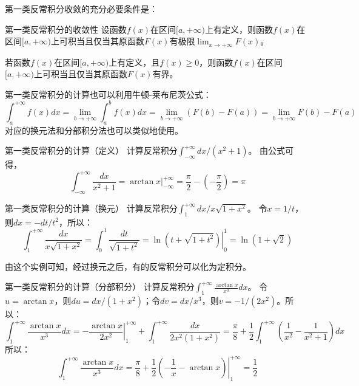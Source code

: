 第一类反常积分收敛的充分必要条件是：
\begin{theorem}{第一类反常积分的收敛性}{}
    设函数$f(x)$在区间$[a, +\infty)$上有定义，则函数$f(x)$在区间$[a, +\infty)$上可积当且仅当其原函数$F(x)$有极限$\lim_{x \to +\infty} F(x)$。
\end{theorem}
\begin{corollary}{}{}
    若函数$f(x)$在区间$[a, +\infty)$上有定义，且$f(x) \ge 0$，则函数$f(x)$在区间$[a, +\infty)$上可积当且仅当其原函数$F(x)$有界。
\end{corollary}{}{}

第一类反常积分的计算也可以利用牛顿-莱布尼茨公式：
\begin{equation}
    \int_a^{+\infty} f(x) dx = \lim_{b \to +\infty} \int_a^b f(x) dx = \lim_{b \to +\infty} (F(b) - F(a)) = \lim_{b \to +\infty} F(b) - F(a)
\end{equation}
对应的换元法和分部积分法也可以类似地使用。

\begin{example}{第一类反常积分的计算（定义）}{}
    计算反常积分$\int_{-\infty}^{+\infty} dx/(x^2+1)$。
    \tcblower
    由公式可得，
    \begin{equation}
        \int_{-\infty}^{+\infty} \frac{dx}{x^2+1} = \left. \arctan x \right|_{-\infty}^{+\infty} = \frac{\pi}{2} - \left(-\frac{\pi}{2}\right) = \pi
    \end{equation}
\end{example}

\begin{example}{第一类反常积分的计算（换元）}{}
    计算反常积分$\int_1^{+\infty} dx/x\sqrt{1+x^2}$。
    \tcblower
    令$x = 1/t$，则$dx = -dt/t^2$，所以：
    \begin{equation}
        \int_1^{+\infty} \frac{dx}{x\sqrt{1+x^2}} = \int_0^1 \frac{dt}{\sqrt{1+t^2}} = \left. \ln(t + \sqrt{1+t^2}) \right|_0^1 = \ln(1 + \sqrt{2})
    \end{equation}

    由这个实例可知，经过换元之后，有的反常积分可以化为定积分。
\end{example}

\begin{example}{第一类反常积分的计算（分部积分）}{}
    计算反常积分$\int_1^{+\infty} \frac{\arctan x}{x^3} dx$。
    \tcblower
    令$u = \arctan x$，则$du = dx/(1+x^2)$；令$dv = dx/x^3$，则$v = -1/(2x^2)$。所以：
    \begin{equation}
        \int_1^{+\infty} \frac{\arctan x}{x^3} dx = \left. -\frac{\arctan x}{2x^2} \right|_1^{+\infty} + \int_1^{+\infty} \frac{dx}{2x^2(1+x^2)} = \frac{\pi}{8} + \frac{1}{2} \int_1^{+\infty} \left( \frac{1}{x^2} - \frac{1}{x^2+1} \right) dx
    \end{equation}
    所以：
    \begin{equation}
        \int_1^{+\infty} \frac{\arctan x}{x^3} dx = \frac{\pi}{8} + \frac{1}{2} \left. \left( -\frac{1}{x} - \arctan x \right) \right|_1^{+\infty} = \frac{1}{2}
    \end{equation}
\end{example}



